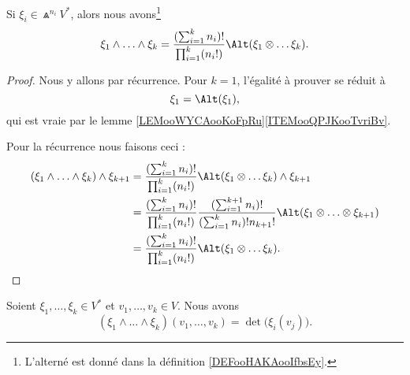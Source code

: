 \begin{lemma}		\label{LEMooZJJLooFGuguy}
	Si \( \xi_i\in \Wedge^{n_i}V^*\), alors nous avons\footnote{L'alterné est donné dans la définition \ref{DEFooHAKAooIfbsEy}.}
	\begin{equation}
		\xi_1\wedge\ldots \wedge \xi_k=\frac{ (\sum_{i=1}^kn_i)! }{ \prod_{i=1}^k(n_i!) }\Alt(\xi_1\otimes \ldots \xi_k).
	\end{equation}
\end{lemma}

\begin{proof}
	Nous y allons par récurrence. Pour \( k=1\), l'égalité à prouver se réduit à
	\begin{equation}
		\xi_1=\Alt(\xi_1),
	\end{equation}
	qui est vraie par le lemme \ref{LEMooWYCAooKoFpRu}\ref{ITEMooQPJKooTvriBv}.

	Pour la récurrence nous faisons ceci :
	\begin{subequations}
		\begin{align}
			(\xi_1\wedge\ldots \wedge \xi_k)\wedge \xi_{k+1} & =\frac{ (\sum_{i=1}^kn_i)! }{ \prod_{i=1}^k(n_i!) }\Alt(\xi_1\otimes \ldots \xi_k)\wedge \xi_{k+1}                                                        \\
			                                                 & =\frac{ (\sum_{i=1}^kn_i)! }{ \prod_{i=1}^k(n_i!) }\frac{ (\sum_{i=1}^{k+1}n_i)! }{ (\sum_{i=1}^kn_i)!n_{k+1}! }\Alt(\xi_1\otimes\ldots\otimes \xi_{k+1}) \\
			                                                 & =\frac{ (\sum_{i=1}^kn_i)! }{ \prod_{i=1}^k(n_i!) }\Alt(\xi_1\otimes \ldots \xi_k).
		\end{align}
	\end{subequations}
\end{proof}

\begin{proposition}		\label{PROPooRRSZooJXOApq}
	Soient \( \xi_1,\ldots,\xi_k\in V^*\) et \( v_1,\ldots,v_k\in V\). Nous avons
	\begin{equation}
		(\xi_1\wedge\ldots\wedge \xi_k)(v_1,\ldots,v_k)=\det\big( \xi_i(v_j) \big).
	\end{equation}
\end{proposition}

